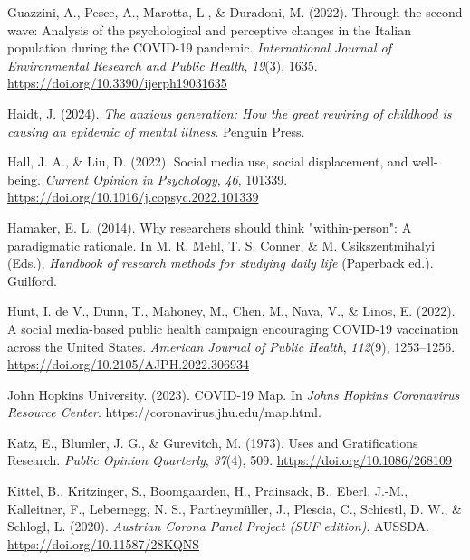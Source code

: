 \documentclass[
  man,mask,floatsintext]{apa7}
\newlength{\cslhangindent}
\newenvironment{CSLReferences}[2] %
 {\begin{list}{}{%
  \setlength{\itemindent}{0pt}
  \setlength{\leftmargin}{0pt}
  \setlength{\parsep}{0pt}
  \ifodd #1
   \setlength{\leftmargin}{\cslhangindent}
   \setlength{\itemindent}{-1\cslhangindent}
  \fi
  \setlength{\itemsep}{#2\baselineskip}}}
 {\end{list}}
\begin{document}
\begin{CSLReferences}{1}{0}
Guazzini, A., Pesce, A., Marotta, L., \& Duradoni, M. (2022). Through the second wave: {Analysis} of the psychological and perceptive changes in the {Italian} population during the {COVID-19} pandemic. \emph{International Journal of Environmental Research and Public Health}, \emph{19}(3), 1635. \url{https://doi.org/10.3390/ijerph19031635}

Haidt, J. (2024). \emph{The anxious generation: How the great rewiring of childhood is causing an epidemic of mental illness}. Penguin Press.

Hall, J. A., \& Liu, D. (2022). Social media use, social displacement, and well-being. \emph{Current Opinion in Psychology}, \emph{46}, 101339. \url{https://doi.org/10.1016/j.copsyc.2022.101339}

Hamaker, E. L. (2014). Why researchers should think "within-person": {A} paradigmatic rationale. In M. R. Mehl, T. S. Conner, \& M. Csikszentmihalyi (Eds.), \emph{Handbook of research methods for studying daily life} (Paperback ed.). Guilford.

Hunt, I. de V., Dunn, T., Mahoney, M., Chen, M., Nava, V., \& Linos, E. (2022). A social media-based public health campaign encouraging {COVID-19} vaccination across the {United States}. \emph{American Journal of Public Health}, \emph{112}(9), 1253--1256. \url{https://doi.org/10.2105/AJPH.2022.306934}

John Hopkins University. (2023). {COVID-19 Map}. In \emph{Johns Hopkins Coronavirus Resource Center}. https://coronavirus.jhu.edu/map.html.

Katz, E., Blumler, J. G., \& Gurevitch, M. (1973). Uses and {Gratifications Research}. \emph{Public Opinion Quarterly}, \emph{37}(4), 509. \url{https://doi.org/10.1086/268109}

Kittel, B., Kritzinger, S., Boomgaarden, H., Prainsack, B., Eberl, J.-M., Kalleitner, F., Lebernegg, N. S., Partheymüller, J., Plescia, C., Schiestl, D. W., \& Schlogl, L. (2020). \emph{Austrian {Corona Panel Project} ({SUF} edition)}. AUSSDA. \url{https://doi.org/10.11587/28KQNS}


\end{CSLReferences}
\end{document}
